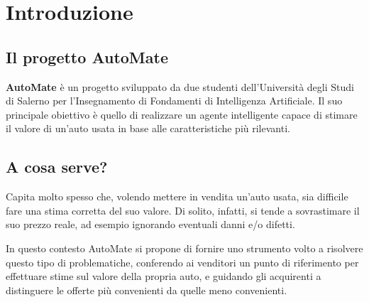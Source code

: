 \chapter{Introduzione}
\section{Il progetto AutoMate}
\textbf{AutoMate} è un progetto sviluppato da due studenti dell'Università degli Studi di Salerno per l'Insegnamento di Fondamenti di Intelligenza Artificiale. 
Il suo principale obiettivo è quello di realizzare un agente intelligente capace di stimare il valore di un'auto usata in base alle caratteristiche più rilevanti.
\medskip
\section{A cosa serve?}
Capita molto spesso che, volendo mettere in vendita un'auto usata, sia difficile fare una stima corretta del suo valore. Di solito, infatti, si tende a sovrastimare 
il suo prezzo reale, ad esempio ignorando eventuali danni e/o difetti.

In questo contesto AutoMate si propone di fornire uno strumento volto a risolvere questo tipo di problematiche, conferendo ai venditori un punto di riferimento 
per effettuare stime sul valore della propria auto, e guidando gli acquirenti a distinguere le offerte più convenienti da quelle meno convenienti.
